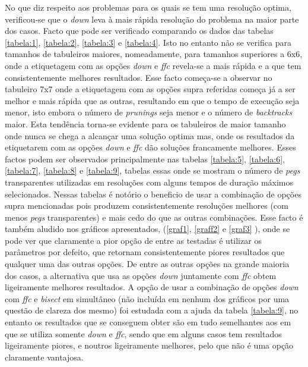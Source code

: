 \documentclass{llncs}
\begin{document}
No que diz respeito aos problemas para os quais se tem uma resolu\c{c}\~{a}o optima, verificou-se que o \emph{down} leva \`{a} mais r\'{a}pida resolu\c{c}\~{a}o do problema na maior parte dos casos. Facto que pode ser verificado comparando os dados das tabelas \ref{tabela:1}, \ref{tabela:2}, \ref{tabela:3} e \ref{tabela:4}. Isto no entanto n\~{a}o se verifica para tamanhos de tabuleiros maiores, nomeadamente, para tamanhos superiores a 6x6, onde a etiquetagem com as op\c{c}\~{o}es \emph{down} e \emph{ffc} revela-se a mais r\'{a}pida e a que tem consistentemente melhores resultados. Esse facto come\c{c}a-se a observar no tabuleiro 7x7 onde a etiquetagem com as op\c{c}\~{o}es supra referidas come\c{c}a j\'{a} a ser melhor e mais r\'{a}pida que as outras, resultando em que o tempo de execu\c{c}\~{a}o seja menor, isto embora o n\'{u}mero de \emph{prunings} seja menor e o n\'{u}mero de \emph{backtracks} maior. Esta tend\^{e}ncia torna-se evidente para os tabuleiros de maior tamanho onde nunca se chega a alcan\c{c}ar uma solu\c{c}\~{a}o optima mas, onde os resultados da etiquetarem com as op\c{c}\~{o}es \emph{down} e \emph{ffc} d\~{a}o solu\c{c}\~{o}es francamente melhores. Esses factos podem ser observados principalmente nas tabelas \ref{tabela:5}, \ref{tabela:6}, \ref{tabela:7}, \ref{tabela:8} e \ref{tabela:9}, tabelas essas onde se mostram o n\'{u}mero de \emph{pegs} transparentes utilizadas em resolu\c{c}\~{o}es com alguns tempos de dura\c{c}\~{a}o m\'{a}ximos selecionados. Nessas tabelas \'{e} not\'{o}rio o beneficio de usar a combina\c{c}\~{a}o de op\c{c}\~{o}es supra mencionadas pois produzem consistentemente resolu\c{c}\~{o}es melhores (com menos \emph{pegs} transparentes) e mais cedo do que as outras combina\c{c}\~{o}es. Esse facto \'{e} tamb\'{e}m aludido nos gr\'{a}ficos apresentados, (\ref{graf1}, \ref{graƒf2} e \ref{graf3} ), onde se pode ver que claramente a pior op\c{c}\~{a}o de entre as testadas \'{e} utilizar os parâmetros por defeito, que retornam consistentemente piores resultados que qualquer uma das outras op\c{c}\~{o}es. De entre as outras op\c{c}\~{o}es na grande maioria dos casos, a alternativa que usa as op\c{c}\~{o}es \emph{down} juntamente com \emph{ffc} obtem ligeiramente melhores resultados.
A op\c{c}\~{a}o de usar a combina\c{c}\~{a}o de op\c{c}\~{o}es \emph{down} com \emph{ffc} e \emph{bisect} em simultâneo (n\~{a}o inclu\'{i}da em nenhum dos gr\'{a}ficos por uma quest\~{a}o de clareza dos mesmo) foi estudada com a ajuda da tabela \ref{tabela:9}, no entanto os resultados que se conseguem obter s\~{a}o em tudo semelhantes aos em que se utiliza somente \emph{down} e \emph{ffc}, sendo que em alguns casos tem resultados ligeiramente piores, e noutros ligeiramente melhores, pelo que n\~{a}o \'{e} uma op\c{c}\~{a}o claramente vantajosa.
\end{document}

